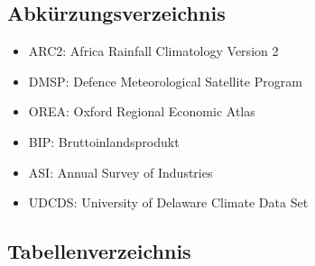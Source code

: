 \setcounter{page}{2}

\renewcommand*\figurename{Abbildung}
\renewcommand*\tablename{Tabelle}

\newpage

\renewcommand*\contentsname{Inhaltsverzeichnis}
{
\hypersetup{linkcolor=}
\setcounter{tocdepth}{3}
\tableofcontents
}

\vspace*{3cm}
\hypertarget{abkuxfcrzungen}{%
\subsection*{Abkürzungsverzeichnis}\label{abkuxfcrzungen}}

\begin{itemize}
\tightlist
\item
  ARC2: Africa Rainfall Climatology Version 2
\item
  DMSP: Defence Meteorological Satellite Program
\item
  OREA: Oxford Regional Economic Atlas
\item
  BIP: Bruttoinlandsprodukt
\item
  ASI: Annual Survey of Industries
\item
  UDCDS: University of Delaware Climate Data Set
\end{itemize}

\newpage

\hypertarget{lot}{%
\subsection*{Tabellenverzeichnis}\label{lot}}

